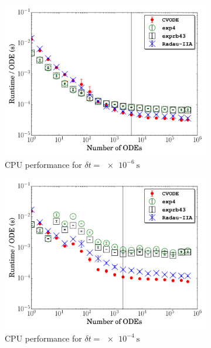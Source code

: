 \documentclass[preprint,review,11pt]{elsarticle}
\begin{document}
\begin{figure}[htb]
  \centering
  \begin{subfigure}{0.49\textwidth}
      \includegraphics[width=\linewidth]{CH4_1e-06_cpu.pdf}
      \caption{CPU performance for $\delta t = \SI{e-6}{\second}$}
      \label{F:ch4_cpu_perf_small}
  \end{subfigure}
  \begin{subfigure}{0.49\textwidth}
      \includegraphics[width=\linewidth]{CH4_1e-04_cpu.pdf}
      \caption{CPU performance for $\delta t = \SI{e-4}{\second}$}
      \label{F:ch4_cpu_perf_large}
  \end{subfigure}\\
  \begin{subfigure}{0.49\textwidth}

\end{subfigure}
\end{figure}
\end{document}
